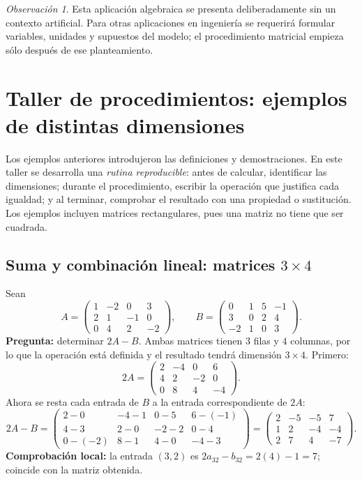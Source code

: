 \documentclass[12pt]{article}
\theoremstyle{remark}
\newtheorem{observacion}[definicion]{Observación}
\begin{document}
\begin{observacion}
Esta aplicación algebraica se presenta deliberadamente sin un contexto artificial. Para otras aplicaciones en ingeniería se requerirá formular variables, unidades y supuestos del modelo; el procedimiento matricial empieza sólo después de ese planteamiento.
\end{observacion}

\section{Taller de procedimientos: ejemplos de distintas dimensiones}
\label{sec:taller}
Los ejemplos anteriores introdujeron las definiciones y demostraciones. En este taller se desarrolla una \emph{rutina reproducible}: antes de calcular, identificar las dimensiones; durante el procedimiento, escribir la operación que justifica cada igualdad; y al terminar, comprobar el resultado con una propiedad o sustitución. Los ejemplos incluyen matrices rectangulares, pues una matriz no tiene que ser cuadrada.

\subsection{Suma y combinación lineal: matrices $3\times4$}
Sean
\[
A=\begin{pmatrix}1&-2&0&3\\2&1&-1&0\\0&4&2&-2\end{pmatrix},\qquad
B=\begin{pmatrix}0&1&5&-1\\3&0&2&4\\-2&1&0&3\end{pmatrix}.
\]
\textbf{Pregunta:} determinar $2A-B$.
Ambas matrices tienen $3$ filas y $4$ columnas, por lo que la operación está definida y el resultado tendrá dimensión $3\times4$. Primero:
\[
2A=\begin{pmatrix}2&-4&0&6\\4&2&-2&0\\0&8&4&-4\end{pmatrix}.
\]
Ahora se resta cada entrada de $B$ a la entrada correspondiente de $2A$:
\[
2A-B=\begin{pmatrix}
2-0&-4-1&0-5&6-(-1)\\
4-3&2-0&-2-2&0-4\\
0-(-2)&8-1&4-0&-4-3
\end{pmatrix}
=\boxed{\begin{pmatrix}2&-5&-5&7\\1&2&-4&-4\\2&7&4&-7\end{pmatrix}}.
\]
\textbf{Comprobación local:} la entrada $(3,2)$ es $2a_{32}-b_{32}=2(4)-1=7$; coincide con la matriz obtenida.
\end{document}
